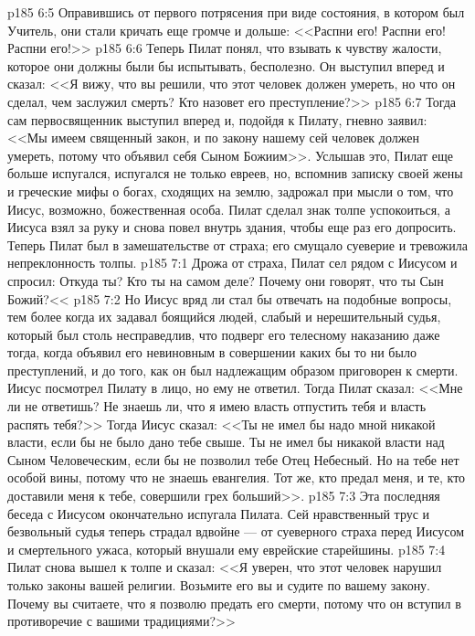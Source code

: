 \vs p185 6:5 Оправившись от первого потрясения при виде состояния, в котором был Учитель, они стали кричать еще громче и дольше: <<Распни его! Распни его! Распни его!>>
\vs p185 6:6 Теперь Пилат понял, что взывать к чувству жалости, которое они должны были бы испытывать, бесполезно. Он выступил вперед и сказал: <<Я вижу, что вы решили, что этот человек должен умереть, но что он сделал, чем заслужил смерть? Кто назовет его преступление?>>
\vs p185 6:7 Тогда сам первосвященник выступил вперед и, подойдя к Пилату, гневно заявил: <<Мы имеем священный закон, и по закону нашему сей человек должен умереть, потому что объявил себя Сыном Божиим>>. Услышав это, Пилат еще больше испугался, испугался не только евреев, но, вспомнив записку своей жены и греческие мифы о богах, сходящих на землю, задрожал при мысли о том, что Иисус, возможно, божественная особа. Пилат сделал знак толпе успокоиться, а Иисуса взял за руку и снова повел внутрь здания, чтобы еще раз его допросить. Теперь Пилат был в замешательстве от страха; его смущало суеверие и тревожила непреклонность толпы.
\vs p185 7:1 Дрожа от страха, Пилат сел рядом с Иисусом и спросил: Откуда ты? Кто ты на самом деле? Почему они говорят, что ты Сын Божий?<<
\vs p185 7:2 Но Иисус вряд ли стал бы отвечать на подобные вопросы, тем более когда их задавал боящийся людей, слабый и нерешительный судья, который был столь несправедлив, что подверг его телесному наказанию даже тогда, когда объявил его невиновным в совершении каких бы то ни было преступлений, и до того, как он был надлежащим образом приговорен к смерти. Иисус посмотрел Пилату в лицо, но ему не ответил. Тогда Пилат сказал: <<Мне ли не ответишь? Не знаешь ли, что я имею власть отпустить тебя и власть распять тебя?>> Тогда Иисус сказал: <<Ты не имел бы надо мной никакой власти, если бы не было дано тебе свыше. Ты не имел бы никакой власти над Сыном Человеческим, если бы не позволил тебе Отец Небесный. Но на тебе нет особой вины, потому что не знаешь евангелия. Тот же, кто предал меня, и те, кто доставили меня к тебе, совершили грех больший>>.
\vs p185 7:3 Эта последняя беседа с Иисусом окончательно испугала Пилата. Сей нравственный трус и безвольный судья теперь страдал вдвойне --- от суеверного страха перед Иисусом и смертельного ужаса, который внушали ему еврейские старейшины.
\vs p185 7:4 Пилат снова вышел к толпе и сказал: <<Я уверен, что этот человек нарушил только законы вашей религии. Возьмите его вы и судите по вашему закону. Почему вы считаете, что я позволю предать его смерти, потому что он вступил в противоречие с вашими традициями?>>
